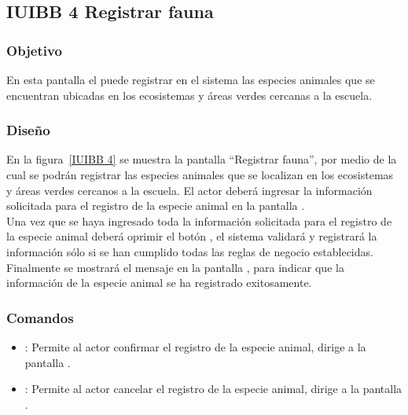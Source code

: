 \subsection{IUIBB 4 Registrar fauna}

\subsubsection{Objetivo}

      En esta pantalla el  puede registrar en el sistema las especies animales que se encuentran ubicadas en los ecosistemas y áreas verdes cercanas a la escuela.

\subsubsection{Diseño}

    En la figura~\ref{IUIBB 4} se muestra la pantalla ``Registrar fauna'', por medio de la cual se podrán registrar las especies animales que se localizan en los ecosistemas y áreas verdes cercanos a la escuela. El actor deberá ingresar la información solicitada para el registro de la especie animal en la pantalla .\\
        
    Una vez que se haya ingresado toda la información solicitada para el registro de la especie animal deberá oprimir el botón , el sistema validará y registrará la información sólo si se han cumplido todas las reglas de negocio establecidas.\\
    
    Finalmente se mostrará el mensaje  en la pantalla , para indicar que la información de la especie animal se ha registrado exitosamente.
      



\subsubsection{Comandos}
    \begin{itemize}
	\item {}: Permite al actor confirmar el registro de la especie animal, dirige a la pantalla .
	\item {}: Permite al actor cancelar el registro de la especie animal, dirige a la pantalla .
    \end{itemize}

